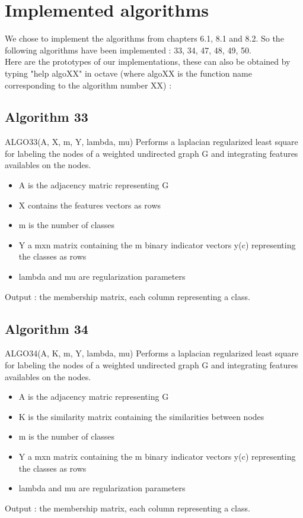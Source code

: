 \documentclass{eplDoc}
\begin{document}
\maketitle
\newpage

\section{Implemented algorithms}

We chose to implement the algorithms from chapters 6.1, 8.1 and 8.2. So the following algorithms have been implemented : 33, 34, 47, 48, 49, 50. \\ 
 Here are the prototypes of our implementations, these can also be obtained by typing "help algoXX" in octave (where algoXX is the function name corresponding to the algorithm number XX)  :   

\subsection{Algorithm 33}
ALGO33(A, X, m, Y, lambda, mu) Performs a laplacian regularized least square for labeling the 
nodes of a weighted undirected graph G and integrating features availables on the nodes.
\begin{itemize}
	\item A is the adjacency matric representing G
  \item  X contains the features vectors as rows
  \item  m is the number of classes
  \item  Y a mxn matrix containing the m binary indicator vectors y(c) representing the classes as rows
  \item  lambda and mu are regularization parameters 
\end{itemize}
 Output : the membership matrix, each column representing a class.

\subsection{Algorithm 34}

ALGO34(A, K, m, Y, lambda, mu) Performs a laplacian regularized least square for labeling the 
nodes of a weighted undirected graph G and integrating features availables on the nodes.
\begin{itemize}
	\item  A is the adjacency matric representing G
  \item  K is the similarity matrix containing the similarities between nodes
  \item  m is the number of classes
  \item  Y a mxn matrix containing the m binary indicator vectors y(c) representing the classes as rows
  \item  lambda and mu are regularization parameters 
\end{itemize}
 Output : the membership matrix, each column representing a class.
\end{document}
